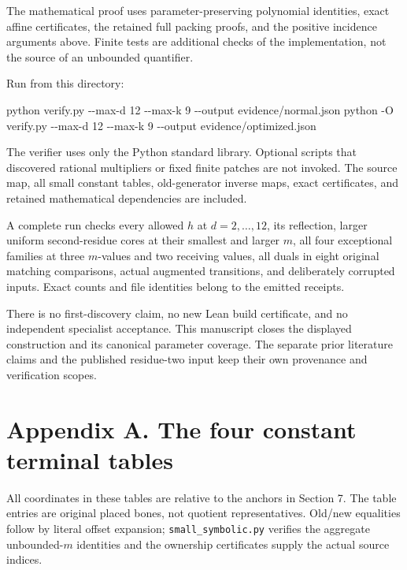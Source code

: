 \documentclass[
  11pt,
]{article}
\newenvironment{Shaded}{}{}
\newcommand{\AttributeTok}[1]{\textcolor[rgb]{0.49,0.56,0.16}{#1}}
\newcommand{\ExtensionTok}[1]{#1}
\newcommand{\NormalTok}[1]{#1}
\begin{document}
The mathematical proof uses parameter-preserving polynomial identities,
exact affine certificates, the retained full packing proofs, and the
positive incidence arguments above. Finite tests are additional checks
of the implementation, not the source of an unbounded quantifier.

Run from this directory:

\begin{Shaded}
\begin{Highlighting}[]
\ExtensionTok{python}\NormalTok{ verify.py }\AttributeTok{{-}{-}max{-}d}\NormalTok{ 12 }\AttributeTok{{-}{-}max{-}k}\NormalTok{ 9 }\AttributeTok{{-}{-}output}\NormalTok{ evidence/normal.json}
\ExtensionTok{python} \AttributeTok{{-}O}\NormalTok{ verify.py }\AttributeTok{{-}{-}max{-}d}\NormalTok{ 12 }\AttributeTok{{-}{-}max{-}k}\NormalTok{ 9 }\AttributeTok{{-}{-}output}\NormalTok{ evidence/optimized.json}
\end{Highlighting}
\end{Shaded}

The verifier uses only the Python standard library. Optional scripts
that discovered rational multipliers or fixed finite patches are not
invoked. The source map, all small constant tables, old-generator
inverse maps, exact certificates, and retained mathematical dependencies
are included.

A complete run checks every allowed \(h\) at \(d=2,\ldots,12\), its
reflection, larger uniform second-residue cores at their smallest and
larger \(m\), all four exceptional families at three \(m\)-values and
two receiving values, all duals in eight original matching comparisons,
actual augmented transitions, and deliberately corrupted inputs. Exact
counts and file identities belong to the emitted receipts.

There is no first-discovery claim, no new Lean build certificate, and no
independent specialist acceptance. This manuscript closes the displayed
construction and its canonical parameter coverage. The separate prior
literature claims and the published residue-two input keep their own
provenance and verification scopes.

\section{Appendix A. The four constant terminal
tables}\label{appendix-a.-the-four-constant-terminal-tables}

All coordinates in these tables are relative to the anchors in Section
7. The table entries are original placed bones, not quotient
representatives. Old/new equalities follow by literal offset expansion;
\texttt{small\_symbolic.py} verifies the aggregate unbounded-\(m\)
identities and the ownership certificates supply the actual source
indices.
\end{document}
